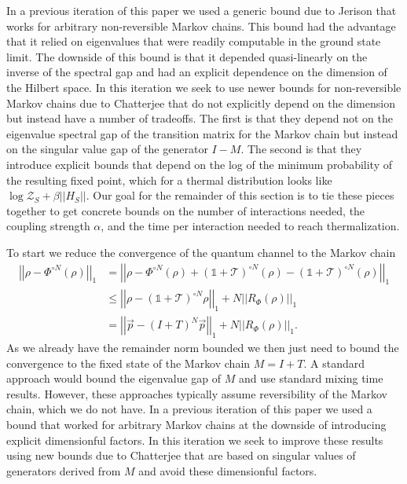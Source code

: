 \documentclass[
 amsmath,amssymb,
 aps,
onecolumn, 
nofootinbib]{revtex4-2}
\newcommand{\norm}[1]{\left|\left| #1 \right|\right|}
\newcommand{\partfun}{\mathcal{Z}}
\newcommand{\id}{\mathds{1}}
\begin{document}
In a previous iteration of this paper we used a generic bound due to Jerison \cite{jerison2013general} that works for arbitrary non-reversible Markov chains. This bound had the advantage that it relied on eigenvalues that were readily computable in the ground state limit. The downside of this bound is that it depended quasi-linearly on the inverse of the spectral gap and had an explicit dependence on the dimension of the Hilbert space. In this iteration we seek to use newer bounds for non-reversible Markov chains due to Chatterjee \cite{chatterjee2025spectral} that do not explicitly depend on the dimension but instead have a number of tradeoffs. The first is that they depend not on the eigenvalue spectral gap of the transition matrix for the Markov chain but instead on the singular value gap of the generator $I - M$. The second is that they introduce explicit bounds that depend on the log of the minimum probability of the resulting fixed point, which for a thermal distribution looks like $\log \partfun_S + \beta \norm{H_S}$. Our goal for the remainder of this section is to tie these pieces together to get concrete bounds on the number of interactions needed, the coupling strength $\alpha$, and the time per interaction needed to reach thermalization.

To start we reduce the convergence of the quantum channel to the Markov chain
\begin{align}
    \norm{\rho - \Phi^{\circ N}(\rho)}_1 &=  \norm{\rho - \Phi^{\circ N}(\rho) + \left(\id + \mathcal{T}\right)^{\circ N}(\rho) - \left(\id + \mathcal{T}\right)^{\circ N}(\rho)}_1 \\
    &\le \norm{\rho - \left(\id + \mathcal{T}\right)^{\circ N} \rho}_1 + N \norm{R_{\Phi}(\rho)}_1 \\
    &= \norm{\vec{p} - (I + T)^N \vec{p}}_1 + N \norm{R_\Phi (\rho)}_1.
\end{align}
As we already have the remainder norm bounded we then just need to bound the convergence to the fixed state of the Markov chain $M =I + T$. A standard approach would bound the eigenvalue gap of $M$ and use standard mixing time results. However, these approaches typically assume reversibility of the Markov chain, which we do not have. In a previous iteration of this paper we used a bound that worked for arbitrary Markov chains at the downside of introducing explicit dimensionful factors. In this iteration we seek to improve these results using new bounds due to Chatterjee \cite{chatterjee2025spectral} that are based on singular values of generators derived from $M$ and avoid these dimensionful factors.
\end{document}
